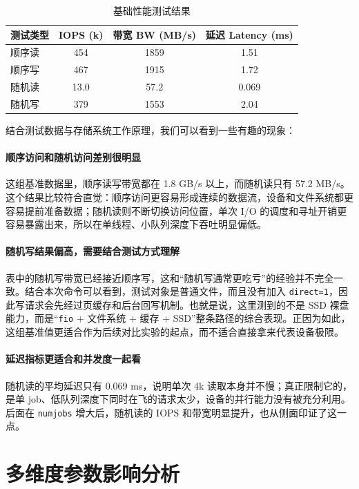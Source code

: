 \documentclass[a4paper]{article}
\begin{document}
\begin{table}[H]
\centering
\renewcommand{\arraystretch}{1.25}
\setlength{\tabcolsep}{12pt}
\begin{tabular}{lccc}
\toprule
\textbf{测试类型} & \textbf{IOPS (k)} & \textbf{带宽 BW (MB/s)} & \textbf{延迟 Latency (ms)} \\
\midrule
顺序读   & 454   & 1859  & 1.51 \\
顺序写   & 467   & 1915  & 1.72 \\
随机读   & 13.0  & 57.2  & 0.069 \\
随机写   & 379   & 1553  & 2.04 \\
\bottomrule
\end{tabular}
\caption{基础性能测试结果}
\end{table}

结合测试数据与存储系统工作原理，我们可以看到一些有趣的现象：
\paragraph{顺序访问和随机访问差别很明显}
这组基准数据里，顺序读写带宽都在 1.8 GB/s 以上，而随机读只有 57.2 MB/s。这个结果比较符合直觉：顺序访问更容易形成连续的数据流，设备和文件系统都更容易提前准备数据；随机读则不断切换访问位置，单次 I/O 的调度和寻址开销更容易暴露出来，所以在单线程、小队列深度下吞吐明显偏低。

\paragraph{随机写结果偏高，需要结合测试方式理解}
表中的随机写带宽已经接近顺序写，这和“随机写通常更吃亏”的经验并不完全一致。结合本次命令可以看到，测试对象是普通文件，而且没有加入 \texttt{direct=1}，因此写请求会先经过页缓存和后台回写机制。也就是说，这里测到的不是 SSD 裸盘能力，而是“\texttt{fio} + 文件系统 + 缓存 + SSD”整条路径的综合表现。正因为如此，这组基准值更适合作为后续对比实验的起点，而不适合直接拿来代表设备极限。

\paragraph{延迟指标更适合和并发度一起看}
随机读的平均延迟只有 0.069 ms，说明单次 4k 读取本身并不慢；真正限制它的，是单 job、低队列深度下同时在飞的请求太少，设备的并行能力没有被充分利用。后面在 \texttt{numjobs} 增大后，随机读的 IOPS 和带宽明显提升，也从侧面印证了这一点。

\section{多维度参数影响分析}
\end{document}
